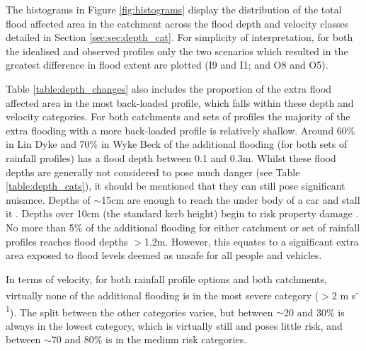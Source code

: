 \documentclass[APA,Times2COL]{WileyNJDv5}
\begin{document}
The histograms in Figure \ref{fig:histograms} display the distribution of the total flood affected area in the catchment across the flood depth and velocity classes detailed in Section \ref{sec:sec:depth_cat}. For simplicity of interpretation, for both the idealised and observed profiles only the two scenarios which resulted in the greatest difference in flood extent are plotted (I9 and I1; and O8 and O5). 



Table \ref{table:depth_changes} also includes the proportion of the extra flood affected area in the most back-loaded profile, which falls within these depth and velocity categories. For both catchments and sets of profiles the majority of the extra flooding with a more back-loaded profile is relatively shallow. Around 60\% in Lin Dyke and 70\% in Wyke Beck of the additional flooding (for both sets of rainfall profiles) has a flood depth between 0.1 and 0.3m. Whilst these flood depths are generally not considered to pose much danger (see Table \ref{table:depth_cats}), it should be mentioned that they can still pose significant nuisance. Depths of $\sim$15cm are enough to reach the under body of a car and stall it \citep{ pregnolato2017impact}.  Depths over 10cm (the standard kerb height) begin to risk property damage \citep{moftakhari2018nuisance}. No more than 5\% of the additional flooding for either catchment or set of rainfall profiles reaches flood depths $>$1.2m. However, this equates to a significant extra area exposed to flood levels deemed as unsafe for all people and vehicles. 

In terms of velocity, for both rainfall profile options and both catchments, virtually none of the additional flooding is in the most severe category ($>$2 m s\textsuperscript{-1}). The split between the other categories varies, but between $\sim$20 and 30\% is always in the lowest category, which is virtually still and poses little risk, and between $\sim$70 and 80\% is in the medium risk categories.  
\end{document}
